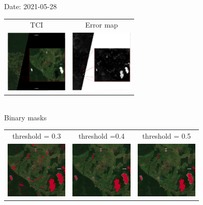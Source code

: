 \documentclass{beamer}
\begin{document}
\begin{frame}{Date: 2021-05-28}
    \centering
        \begin{tabular}{cc}
        TCI & Error map\\
        \includegraphics[width=3cm]{Figures/v3/20210528/TCI/TCI_zoom1.pdf}
        &
        \includegraphics[width=3cm]{Figures/v3/20210528/error_map/error_zoom1.pdf}
    \end{tabular}
    \\
   \centering
    Binary masks
        \begin{tabular}{ccc}
            threshold = 0.3  & threshold =0.4 &  threshold = 0.5 \\
        \includegraphics[width=3cm]{Figures/v3/20210528/umbral_03/zoom1.png}
        &
        \includegraphics[width=3cm]{Figures/v3/20210528/umbral_04/zoom1.png}
        &
        \includegraphics[width=3cm]{Figures/v3/20210528/umbral_05/zoom1.png}
        \end{tabular}
\end{frame}
\end{document}
